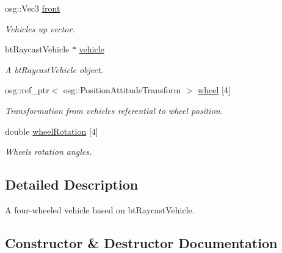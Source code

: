 \begin{DoxyCompactItemize}
\mbox{\label{classbtosgVehicle_a5b21a5ad3a8583f773bce6b894ac010d}} 
osg\+::\+Vec3 \hyperlink{classbtosgVehicle_a5b21a5ad3a8583f773bce6b894ac010d}{front}
\begin{DoxyCompactList}\small\item\em Vehicle\textquotesingle{}s up vector. \end{DoxyCompactList}\item 
\mbox{\label{classbtosgVehicle_ac45b117f8b523f7040de99639deb7522}} 
bt\+Raycast\+Vehicle $\ast$ \hyperlink{classbtosgVehicle_ac45b117f8b523f7040de99639deb7522}{vehicle}
\begin{DoxyCompactList}\small\item\em A bt\+Raycast\+Vehicle object. \end{DoxyCompactList}\item 
\mbox{\label{classbtosgVehicle_a37edb4c28551037829ffd79c7bc315ba}} 
osg\+::ref\+\_\+ptr$<$ osg\+::\+Position\+Attitude\+Transform $>$ \hyperlink{classbtosgVehicle_a37edb4c28551037829ffd79c7bc315ba}{wheel} \mbox{[}4\mbox{]}
\begin{DoxyCompactList}\small\item\em Transformation from vehicle\textquotesingle{}s referential to wheel position. \end{DoxyCompactList}\item 
\mbox{\label{classbtosgVehicle_a0a9cd6f2c9b0defc44cd5e2e8d597418}} 
double \hyperlink{classbtosgVehicle_a0a9cd6f2c9b0defc44cd5e2e8d597418}{wheel\+Rotation} \mbox{[}4\mbox{]}
\begin{DoxyCompactList}\small\item\em Wheels\textquotesingle{} rotation angles. \end{DoxyCompactList}\end{DoxyCompactItemize}


\subsection{Detailed Description}
A four-\/wheeled vehicle based on bt\+Raycast\+Vehicle. 

\subsection{Constructor \& Destructor Documentation}
\mbox{\label{classbtosgVehicle_a462222cde5a3480b8964b582fcbf39a3}} 
